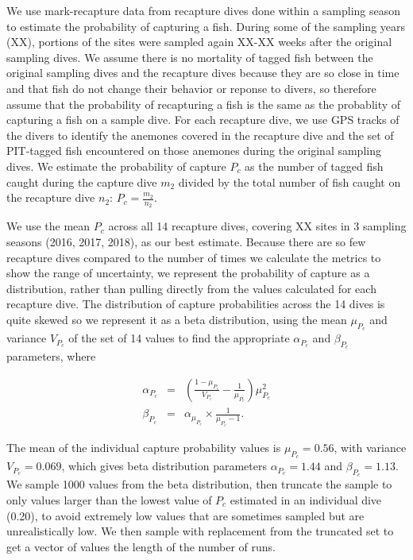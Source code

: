 \documentclass[12pt, oneside]{article}   	%
\begin{document}
We use mark-recapture data from recapture dives done within a sampling season to estimate the probability of capturing a fish. During some of the sampling years (XX), portions of the sites were sampled again XX-XX weeks after the original sampling dives. We assume there is no mortality of tagged fish between the original sampling dives and the recapture dives because they are so close in time and that fish do not change their behavior or reponse to divers, so therefore assume that the probability of recapturing a fish is the same as the probablity of capturing a fish on a sample dive. For each recapture dive, we use GPS tracks of the divers to identify the anemones covered in the recapture dive and the set of PIT-tagged fish encountered on those anemones during the original sampling dives. We estimate the probability of capture $P_c$ as the number of tagged fish caught during the capture dive $m_2$ divided by the total number of fish caught on the recapture dive $n_2$: $P_c = \frac{m_2}{n_2}$. 

We use the mean $P_c$ across all 14 recapture dives, covering XX sites in 3 sampling seasons (2016, 2017, 2018), as our best estimate. Because there are so few recapture dives compared to the number of times we calculate the metrics to show the range of uncertainty, we represent the probability of capture as a distribution, rather than pulling directly from the values calculated for each recapture dive. The distribution of capture probabilities across the 14 dives is quite skewed so we represent it as a beta distribution, using the mean $\mu_{P_c}$ and variance $V_{P_c}$ of the set of 14 values to find the appropriate $\alpha_{P_c}$ and $\beta_{P_c}$ parameters, where 

\begin{eqnarray}
\alpha_{P_c} &=& (\frac{1-\mu_{P_c}}{V_{P_c}} - \frac{1}{\mu_{P_c}}) \mu_{P_c}^2 \\
\beta_{P_c} &=& \alpha_{\mu_{P_c}} \times \frac{1}{\mu_{P_c} - 1}. \label{APP_EQN_ProbCapBetaDistParams}  %
\end{eqnarray}


The mean of the individual capture probability values is $\mu_{P_c} = 0.56$, with variance $V_{P_c} = 0.069$, which gives beta distribution parameters $\alpha_{P_c} = 1.44$ and $\beta_{P_c} = 1.13$. We sample 1000 values from the beta distribution, then truncate the sample to only values larger than the lowest value of $P_c$ estimated in an individual dive (0.20), to avoid extremely low values that are sometimes sampled but are unrealistically low. We then sample with replacement from the truncated set to get a vector of values the length of the number of runs.
\end{document}
